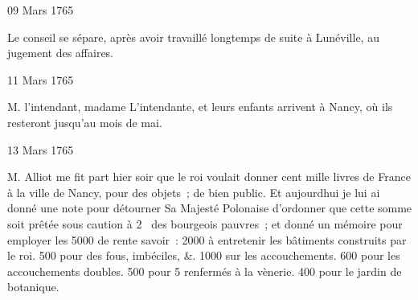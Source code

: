                      \begin{diary}{09 Mars 1765}{}
                        
                        
                           Le conseil se sépare, après avoir
                           travaillé
                           longtemps de suite à Lunéville, au jugement
                           des affaires. \bigskip
        
        
                     \end{diary}

                     \begin{diary}{11 Mars 1765}{}
                        
                        
                           M. l'intendant, madame L'intendante, et leurs
                           enfants arrivent à Nancy, où ils
                           resteront
                           jusqu'au mois de mai.
                        \bigskip
        
        
                     \end{diary}

                     \begin{diary}{13 Mars 1765}{}
                        
                        
                           M. Alliot me fit part hier soir que
                              le roi
                           voulait donner cent mille livres de France à la ville
                              de Nancy, pour des objets ; de bien public. Et
                           aujourdhui je lui ai donné une note pour détourner
                              Sa Majesté Polonaise d'ordonner que cette somme soit
                           prêtée sous caution à 2 %
                           des bourgeois pauvres ; et donné un mémoire
                           pour employer les 5000 de rente savoir :
                           2000 à entretenir les bâtiments construits
                           par le roi. 500
                           pour des fous, imbéciles, &.
                           1000 sur les accouchements. 600 pour
                           les accouchements doubles. 500 pour 5
                           renfermés à la
                           vènerie. 400 pour le jardin
                              de botanique. \bigskip
        
        
                     \end{diary}

